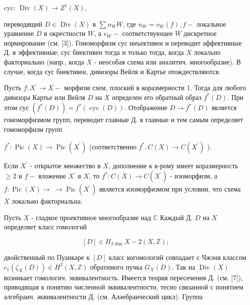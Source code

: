 \documentclass[10pt]{article}
\begin{document}
cyc: $\operatorname{Div}(X) \rightarrow Z^{1}(X)$,



переводящий $D \in \operatorname{Div}(X)$ в $\sum n_{W} W$, где $n_{W}=v_{W}(f), f-$ локальное уравнение $D$ в окрестности $W$, а $v_{W}-$ соответствующее $W$ дискретное нормирование (см. [3]). Гомоморфизм сус инъективен и переводит әффективные Д. в эффективные; сус биективен тогда и только тогда, когда $X$ локально факториально (напр., когда $X$ - неособая схема или аналитич. многообразие). В случае, когда сус биективен, дивизоры Вейля и Картье отождествляются.



Пусть $f: X^{\prime} \rightarrow X-$ морфизм схем, плоский в коразмерности 1. Тогда для любого дивизора Картье или Вейля $D$ на $X$ определен его обратный образ $f^{*}(D)$. При этом сус $\left(f^{*}(D)\right)=f^{*}(\operatorname{cyc}(D))$. Отображение $D \rightarrow f^{*}(D)$ является гомоморфизмом групп, переводит главные Д. в главные и тем самым определяет гомоморфизм групп



$f^{*}: \operatorname{Pic}(X) \longrightarrow \operatorname{Pic}\left(X^{\prime}\right)$ (соответственно $f^{*}: C(X) \longrightarrow C\left(X^{\prime}\right)$ ).



Если $X^{\prime}$ - открытое множество в $X$, дополнение к к-рому имеет коразмерность $\geqslant 2$ и $f-$ вложение $X^{\prime}$ в $X$, то $f^{*}: C(X) \rightarrow C\left(X^{\prime}\right)$ - изоморфизм, а $f: \operatorname{Pic}(X) \rightarrow$ $\rightarrow \operatorname{Pic}\left(X^{\prime}\right)$ является изоморфизмом при условии, что схема $X$ локально факториальна.



Пусть $X$ - гладкое проективное многообразие над $\mathbb{C}$ Каждый Д. $D$ на $X$ определяет класс гомологий



\[

[D] \in H_{2 \operatorname{dim}} X-2(X, \mathbb{Z}) ;

\]



двойственный по Пуанкаре к $[D]$ класс когомологий совпадает с Чжэня классом $c_{1}\left(\zeta_{X}(D)\right) \in H^{2}(X, \mathbb{Z})$ обратимого пучка $G_{X}(D)$. Так на $\operatorname{Div}(X)$ возникает гомологич. эквивалентность. Имеется теория пересечения Д. (см. [7]), приводящая к понятию численной эквивалентности, тесно связанной с понятием алгебраич. әквивалентности Д. (см. Аләебраический цикл). Группа
\end{document}
